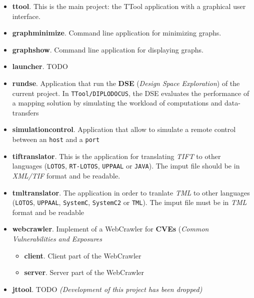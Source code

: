 \documentclass[12pt]{article}
\begin{document}
\begin{itemize}
    \item \textbf{ttool}. This is the main project: the TTool application with a
        graphical user interface.
    \item \textbf{graphminimize}. Command line application for minimizing graphs.
    \item \textbf{graphshow}. Command line application for displaying graphs.
    \item \textbf{launcher}. TODO 
    \item \textbf{rundse}. Application that run the \textbf{DSE} (\textit{Design Space Exploration}) of the current project. In \texttt{TTool/DIPLODOCUS}, the DSE evaluates the performance of a mapping solution by simulating the workload of computations and data-transfers
    \item \textbf{simulationcontrol}. Application that allow to simulate a remote control between an \texttt{host} and a \texttt{port}
    \item \textbf{tiftranslator}. This is the application for translating \textit{TIFT} to other languages (\texttt{LOTOS}, \texttt{RT-LOTOS}, \texttt{UPPAAL} or \texttt{JAVA}). The imput file should be in \textit{XML/TIF} format and be readable.
    \item \textbf{tmltranslator}. The application in order to tranlate \textit{TML} to other languages (\texttt{LOTOS}, \texttt{UPPAAL}, \texttt{SystemC}, \texttt{SystemC2} or \texttt{TML}). The imput file must be in \textit{TML} format and be readable
    \item \textbf{webcrawler}. Implement of a WebCrawler for \textbf{CVEs} (\textit{Common Vulnerabilities and Exposures}
        \begin{itemize}
            \item \textbf{client}. Client part of the WebCrawler 
            \item \textbf{server}. Server part of the WebCrawler
        \end{itemize}
    \item \textbf{jttool}. TODO \textit{(Development of this project has been
        dropped)}
\end{itemize}
\end{document}

